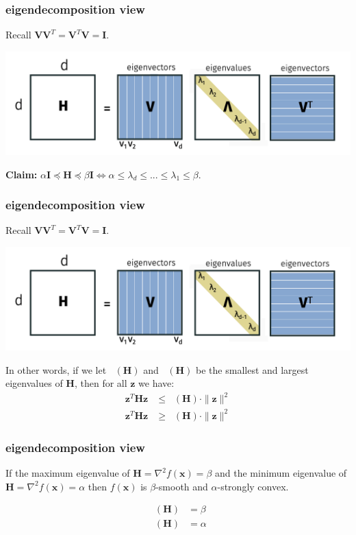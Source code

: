 \documentclass[compress]{beamer}
\newcommand{\bv}[1]{\mathbf{#1}}
\DeclareMathOperator*{\lmin}{\lambda_{min}}
\DeclareMathOperator*{\lmax}{\lambda_{max}}
\begin{document}
\begin{frame}[t]
	\frametitle{eigendecomposition view}
	Recall $\bv{V}\bv{V}^T = \bv{V}^T\bv{V} = \bv{I}$.
	\begin{center}
		\includegraphics[width=.9\textwidth]{eigendecomp.png}
	\end{center}
	\textbf{Claim:}	$\alpha\bv{I} \preceq \bv{H} \preceq \beta \bv{I} \Leftrightarrow \alpha \leq \lambda_d \leq ... \leq \lambda_1 \leq \beta$. 
\end{frame}

\begin{frame}[t]
	\frametitle{eigendecomposition view}
	Recall $\bv{V}\bv{V}^T = \bv{V}^T\bv{V} = \bv{I}$.
	\begin{center}
		\includegraphics[width=.9\textwidth]{eigendecomp.png}
	\end{center}
	In other words, if we let $\lmax(\bv{H})$ and $\lmin(\bv{H})$ be the smallest and largest eigenvalues of $\bv{H}$, then for all $\bv{z}$ we have: 
	\begin{align*}
		\bv{z}^T\bv{H}\bv{z} &\leq \lmax(\bv{H})\cdot \|\bv{z}\|^2 \\
		\bv{z}^T\bv{H}\bv{z} &\geq \lmin(\bv{H})\cdot \|\bv{z}\|^2 
	\end{align*}
	
\end{frame}


\begin{frame}[t]
	\frametitle{eigendecomposition view}
	If the maximum eigenvalue of $\bv{H} = \nabla^2f(\bv{x}) = \beta$ and the minimum eigenvalue of $\bv{H} = \nabla^2f(\bv{x}) = \alpha$ then $f(\bv{x})$ is $\beta$-smooth and $\alpha$-strongly convex.
	
	\begin{align*}
		\lmax(\bv{H}) &= \beta\\
		\lmin(\bv{H}) &= \alpha
	\end{align*}
\end{frame}
\end{document}
